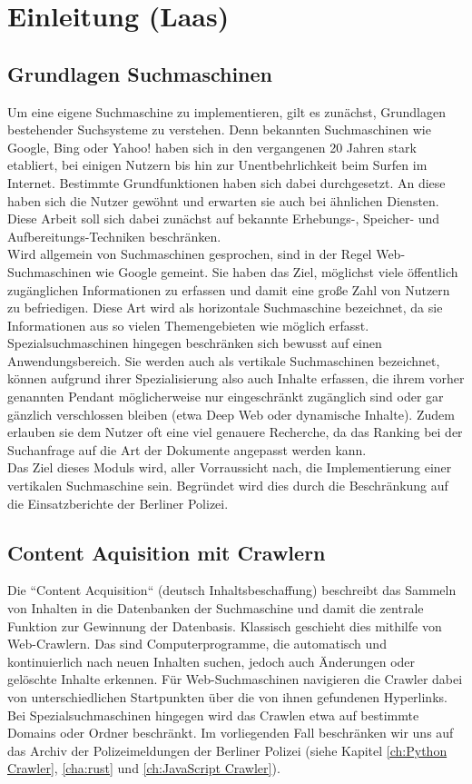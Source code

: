 \chapter{Einleitung \small(Laas)}

\section{Grundlagen Suchmaschinen}
Um eine eigene Suchmaschine zu implementieren, gilt es zunächst, Grundlagen bestehender Suchsysteme zu verstehen. Denn bekannten Suchmaschinen wie Google, Bing oder Yahoo! haben sich in den vergangenen 20 Jahren stark etabliert, bei einigen Nutzern bis hin zur Unentbehrlichkeit beim Surfen im Internet. Bestimmte Grundfunktionen haben sich dabei durchgesetzt. An diese haben sich die Nutzer gewöhnt und erwarten sie auch bei ähnlichen Diensten. Diese Arbeit soll sich dabei zunächst auf bekannte Erhebungs-, Speicher- und Aufbereitungs-Techniken beschränken.\\
Wird allgemein von Suchmaschinen gesprochen, sind in der Regel Web-Suchmaschinen wie Google gemeint. Sie haben das Ziel, möglichst viele öffentlich zugänglichen Informationen zu erfassen und damit eine große Zahl von Nutzern zu befriedigen. Diese Art wird als horizontale Suchmaschine bezeichnet, da sie Informationen aus so vielen Themengebieten wie möglich erfasst.\\
Spezialsuchmaschinen hingegen beschränken sich bewusst auf einen Anwendungsbereich. Sie werden auch als vertikale Suchmaschinen bezeichnet, können aufgrund ihrer Spezialisierung also auch Inhalte erfassen, die ihrem vorher genannten Pendant möglicherweise nur eingeschränkt zugänglich sind oder gar gänzlich verschlossen bleiben (etwa Deep Web oder dynamische Inhalte). Zudem erlauben sie dem Nutzer oft eine viel genauere Recherche, da das Ranking bei der Suchanfrage auf die Art der Dokumente angepasst werden kann.\\
Das Ziel dieses Moduls wird, aller Vorraussicht nach, die Implementierung einer vertikalen Suchmaschine sein. Begründet wird dies durch die Beschränkung auf die Einsatzberichte der Berliner Polizei. \cite{suchmverst} \cite{boldsuche}

\section{Content Aquisition mit Crawlern}
Die ``Content Acquisition`` (deutsch Inhaltsbeschaffung) beschreibt das Sammeln von Inhalten in die Datenbanken der Suchmaschine und damit die zentrale Funktion zur Gewinnung der Datenbasis. Klassisch geschieht dies mithilfe von Web-Crawlern. Das sind Computerprogramme, die automatisch und kontinuierlich nach neuen Inhalten suchen, jedoch auch Änderungen oder gelöschte Inhalte erkennen. Für Web-Suchmaschinen navigieren die Crawler dabei von unterschiedlichen Startpunkten über die von ihnen gefundenen Hyperlinks. Bei Spezialsuchmaschinen hingegen wird das Crawlen etwa auf bestimmte Domains oder Ordner beschränkt. Im vorliegenden Fall beschränken wir uns auf das Archiv der Polizeimeldungen der Berliner Polizei (siehe Kapitel \ref{ch:Python Crawler}, \ref{cha:rust} und \ref{ch:JavaScript Crawler}). \cite{suchmverst}

